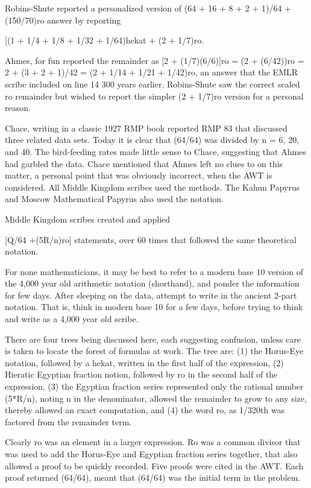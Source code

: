 \documentclass[12pt]{article}
\begin{document}
Robins-Shute reported a personalized version of (64 + 16 + 8 + 2 + 1)/64 + (150/70)ro answer by reporting 

[(1 + 1/4 + 1/8 + 1/32 + 1/64)hekat + (2 + 1/7)ro.

Ahmes, for fun reported the remainder as [2 + (1/7)(6/6)]ro = (2 + (6/42))ro = 2 + (3 + 2 + 1)/42 = (2 + 1/14 + 1/21 + 1/42)ro, an answer that the EMLR scribe included on line 14 300 years earlier. Robins-Shute saw the correct scaled ro remainder but wished to report the simpler (2 + 1/7)ro version for a personal reason.       

Chace, writing in a classic 1927 RMP book reported RMP 83 that discussed three related data sets. Today it is clear that (64/64) was divided by n = 6, 20, and 40. The bird-feeding rates made little sense to Chace, suggesting that Ahmes had garbled the data. Chace mentioned that Ahmes left no clues to on this matter, a personal point that was obviously incorrect, when the AWT is considered. All Middle Kingdom scribes used the methods. The Kahun Papyrus and Moscow Mathematical Papyrus also used the notation.

Middle Kingdom scribes created and applied

[Q/64 +(5R/n)ro] statements, over 60 times that followed the same theoretical notation.

For none mathematicians, it may be best to refer to a modern base 10 version of the 4,000 year old arithmetic notation (shorthand), and ponder the information for few days. After sleeping on the data, attempt to write in the ancient 2-part notation. That is, think in modern base 10 for a few days, before trying to think and write as a 4,000 year old scribe.

There are four trees being discussed here, each suggesting confusion, unless care is taken to locate the forest of formulas at work. The tree are: (1) the Horus-Eye notation, followed by a hekat, written in the first half of the expression, (2) Hieratic Egyptian fraction notion, followed by ro in the second half of the expression, (3) the Egyptian fraction series represented only the rational number (5*R/n), noting n in the denominator, allowed the remainder to grow to any size, thereby allowed an exact computation, and (4) the word ro, as 1/320th was factored from the remainder term.

Clearly ro was an element in a larger expression. Ro was a common divisor that was used to add the Horus-Eye and Egyptian fraction series together, that also allowed a proof to be quickly recorded. Five proofs were cited in the AWT. Each proof returned (64/64), meant that (64/64) was the initial term in the problem.
\end{document}
